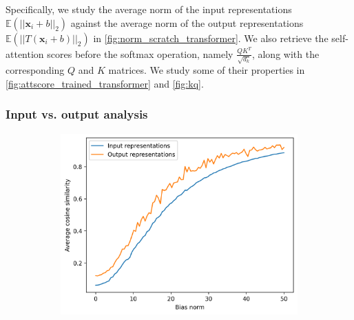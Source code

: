 Specifically, we study the average norm of the input representations $\mathbb{E}(||\mathbf{x}_i + b||_2)$ against the average norm of the output representations $\mathbb{E}(||T(\mathbf{x}_i + b)||_2)$ in \autoref{fig:norm_scratch_transformer}. We also retrieve the self-attention scores before the softmax operation, namely $\frac{QK^T}{\sqrt{d_k}}$, along with the corresponding $Q$ and $K$ matrices. We study some of their properties in \autoref{fig:attscore_trained_transformer} and \autoref{fig:kq}.

\subsubsection{Input vs. output analysis}
\begin{figure}[ht]
    \centering
    \begin{subfigure}[b]{0.8\columnwidth}
         \includegraphics[width=\linewidth]{sources/part_1/anisotropy/imgs/scratch_bert_base_input_vs_output.png}
         \label{fig:cos_scratch_transformer}
         

\end{subfigure}
\end{figure}
